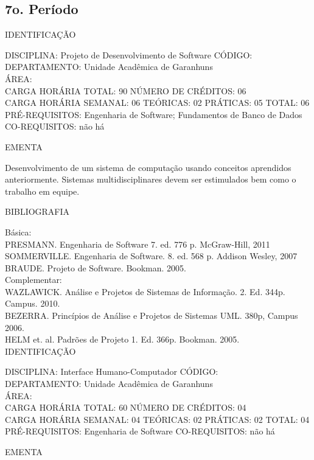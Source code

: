 \documentclass[
	12pt,				%
	openright,			%
  oneside,     %
	a4paper,			%
	chapter=TITLE,		%
	english,			%
	french,				%
	spanish,			%
	brazil				%
	]{abntex2}
\begin{document}
\begin{apendicesenv}
\section*{7o. Período}

IDENTIFICAÇÃO

DISCIPLINA: Projeto de Desenvolvimento de Software CÓDIGO:\\ 
DEPARTAMENTO: Unidade Acadêmica de Garanhuns\\ 
ÁREA: \\
CARGA HORÁRIA TOTAL: 90 NÚMERO DE CRÉDITOS: 06\\
CARGA HORÁRIA SEMANAL: 06 TEÓRICAS: 02 PRÁTICAS: 05 TOTAL: 06\\
PRÉ-REQUISITOS: Engenharia de Software; Fundamentos de Banco de Dados\\
CO-REQUISITOS: não há

EMENTA 

Desenvolvimento de um sistema de computação usando conceitos aprendidos
anteriormente. Sistemas multidisciplinares devem ser estimulados bem
como o trabalho em equipe.

BIBLIOGRAFIA 

Básica:\\
PRESMANN. Engenharia de Software 7. ed. 776 p. McGraw-Hill, 2011\\
SOMMERVILLE. Engenharia de Software. 8. ed. 568 p. Addison Wesley, 2007\\
BRAUDE. Projeto de Software. Bookman. 2005.\\
Complementar:\\
WAZLAWICK. Análise e Projetos de Sistemas de Informação. 2. Ed. 344p.
Campus. 2010.\\
BEZERRA. Princípios de Análise e Projetos de Sistemas UML. 380p, Campus
2006.\\
HELM et. al. Padrões de Projeto 1. Ed. 366p. Bookman. 2005.\\


\newpage IDENTIFICAÇÃO

DISCIPLINA: Interface Humano-Computador CÓDIGO:\\
DEPARTAMENTO: Unidade Acadêmica de Garanhuns\\
ÁREA: \\
CARGA HORÁRIA TOTAL: 60 NÚMERO DE CRÉDITOS: 04\\
CARGA HORÁRIA SEMANAL: 04 TEÓRICAS: 02 PRÁTICAS: 02 TOTAL: 04\\
PRÉ-REQUISITOS: Engenharia de Software
CO-REQUISITOS: não há

EMENTA 


\end{apendicesenv}
\end{document}
